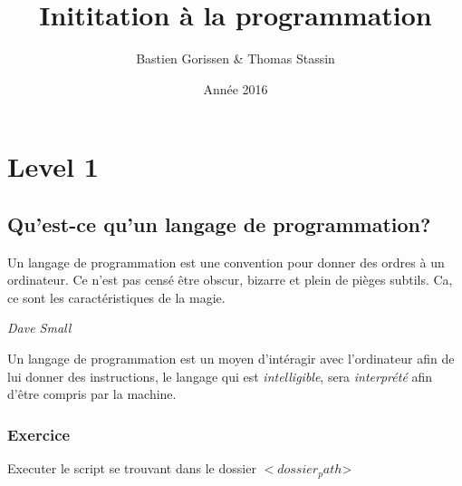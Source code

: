 \documentclass[12pt,a4paper]{book}
\begin{document}
\title{Inititation à la programmation}
\author{Bastien Gorissen & Thomas Stassin}
\date{Année 2016}

\maketitle

\chapter{Level 1}


\section{Qu’est-ce qu’un langage de programmation?}

\epigraph{Un langage de programmation est une convention pour donner des ordres à un ordinateur. Ce n’est pas censé être obscur, bizarre et plein de pièges subtils. Ca, ce sont les caractéristiques de la magie.}{\textit{Dave Small}}

Un langage de programmation est un moyen d’intéragir avec l’ordinateur afin de lui donner des instructions, le langage qui est \textit{intelligible}, sera \textit{interprété} afin d’être compris par la machine.

\subsection{Exercice}

Executer le script se trouvant dans le dossier $<dossier_path$>
\end{document}
